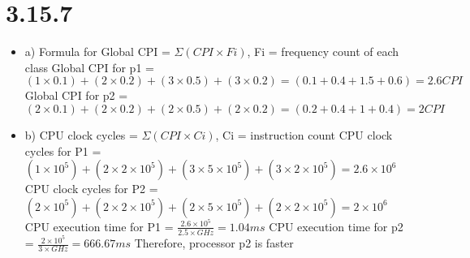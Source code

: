 \documentclass{article}
\begin{document}
\section{3.15.7}
\begin{itemize}
  \item a) Formula for Global CPI = $\Sigma (CPI \times Fi)$, Fi = frequency count of each class\newline
  Global CPI for p1 = $(1 \times 0.1) + (2 \times 0.2) + (3 \times 0.5) + (3 \times 0.2) = (0.1 + 0.4 + 1.5 + 0.6) = 2.6CPI$\newline
  Global CPI for p2 = $(2 \times 0.1) + (2 \times 0.2) + (2 \times 0.5) + (2 \times 0.2) = (0.2 + 0.4 + 1 + 0.4) = 2CPI$\newline
  
  \item b) CPU clock cycles = $\Sigma (CPI \times Ci)$, Ci = instruction count\newline
  CPU clock cycles for P1 = $(1 \times 10^5) + (2 \times 2 \times 10^5) + (3 \times 5 \times 10^5) + (3 \times 2 \times 10^5) = 2.6 \times 10^6$\newline
  CPU clock cycles for P2 = $(2 \times 10^5) + (2 \times 2 \times 10^5) + (2 \times 5 \times 10^5) + (2 \times 2 \times 10^5) = 2 \times 10^6$\newline
  CPU execution time for P1 = $\frac{2.6 \times 10^5}{2.5 \times GHz} = 1.04 ms$\newline
  CPU execution time for p2 = $\frac{2 \times 10^5}{3 \times GHz} = 666.67 ms$\newline
  Therefore, processor p2 is faster
  
\end{itemize}
\end{document}
